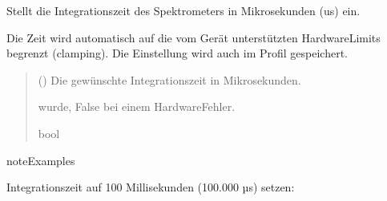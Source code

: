 \documentclass[letterpaper,10pt,english]{sphinxmanual}
\begin{document}
\begin{fulllineitems}
\begin{fulllineitems}
\end{fulllineitems}


\begin{fulllineitems}
\label{\detokenize{modulab/spectrometer_manager:modules.spectrometer.SpectrometerManager.SpectrometerManager.set_integrationtime}}
\pysigstartsignatures
\pysiglinewithargsret
{}
{}
{}
\pysigstopsignatures
\sphinxAtStartPar
Stellt die Integrationszeit des Spektrometers in Mikrosekunden (us) ein.

\sphinxAtStartPar
Die Zeit wird automatisch auf die vom Gerät unterstützten Hardware\sphinxhyphen{}Limits
begrenzt (clamping). Die Einstellung wird auch im Profil gespeichert.
\begin{quote}\begin{description}
\sphinxAtStartPar
{} () \textendash{} Die gewünschte Integrationszeit in Mikrosekunden.

\sphinxAtStartPar
\begin{description}
\sphinxAtStartPar
wurde, False bei einem Hardware\sphinxhyphen{}Fehler.

\end{description}


\sphinxAtStartPar
bool

\end{description}\end{quote}

\begin{sphinxadmonition}{note}{Examples}

\sphinxAtStartPar
Integrationszeit auf 100 Millisekunden (100.000 µs) setzen:

\begin{sphinxVerbatim}[commandchars=\\\{\}]
  
\end{sphinxVerbatim}


\end{sphinxadmonition}
\end{fulllineitems}
\end{fulllineitems}
\end{document}
